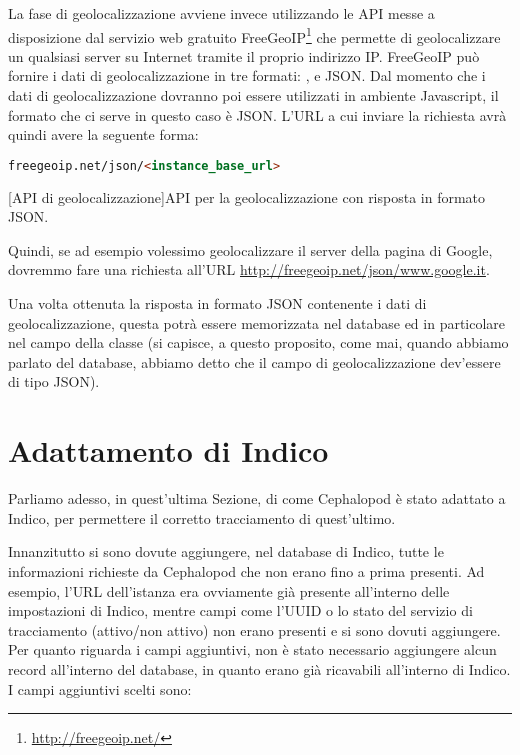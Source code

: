             La fase di geolocalizzazione avviene invece utilizzando le \ac{API} messe a disposizione dal servizio web gratuito FreeGeoIP\footnote{\url{http://freegeoip.net/}} che permette di geolocalizzare un qualsiasi server su Internet tramite il proprio indirizzo \ac{IP}. FreeGeoIP può fornire i dati di geolocalizzazione in tre formati: ,  e \ac{JSON}. Dal momento che i dati di geolocalizzazione dovranno poi essere utilizzati in ambiente Javascript, il formato che ci serve in questo caso è \ac{JSON}. L'\ac{URL} a cui inviare la richiesta avrà quindi avere la seguente forma:
            
            \begin{center}
                \begin{lstlisting}[language=html, gobble=18]
                    freegeoip.net/json/<instance_base_url>
                \end{lstlisting}
                \captionsetup{textformat=empty,labelformat=empty} \vspace{-2em}
                [API di geolocalizzazione]{API per la geolocalizzazione con risposta in formato JSON.}
            \end{center}
            
            Quindi, se ad esempio volessimo geolocalizzare il server della pagina di Google, dovremmo fare una richiesta all'\ac{URL} \url{http://freegeoip.net/json/www.google.it}.
            
            Una volta ottenuta la risposta in formato \ac{JSON} contenente i dati di geolocalizzazione, questa potrà essere memorizzata nel database ed in particolare nel campo  della classe  (si capisce, a questo proposito, come mai, quando abbiamo parlato del database, abbiamo detto che il campo di geolocalizzazione dev'essere di tipo \ac{JSON}).
    
    \section{Adattamento di Indico} \label{sec:it;adattamento_indico}
    
        Parliamo adesso, in quest'ultima Sezione, di come Cephalopod è stato adattato a Indico, per permettere il corretto tracciamento di quest'ultimo.
        
        Innanzitutto si sono dovute aggiungere, nel database di Indico, tutte le informazioni richieste da Cephalopod che non erano fino a prima presenti. Ad esempio, l'\ac{URL} dell'istanza era ovviamente già presente all'interno delle impostazioni di Indico, mentre campi come l'\ac{UUID} o lo stato del servizio di tracciamento (attivo/non attivo) non erano presenti e si sono dovuti aggiungere. Per quanto riguarda i campi aggiuntivi, non è stato necessario aggiungere alcun record all'interno del database, in quanto erano già ricavabili all'interno di Indico. I campi aggiuntivi scelti sono:
        
